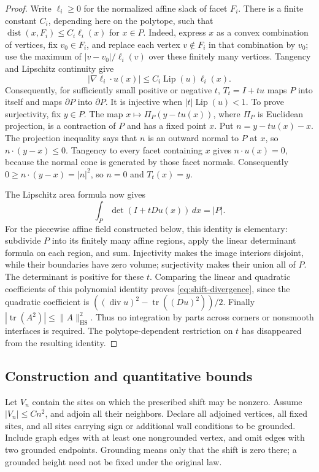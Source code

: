 \begin{proof}
Write $\ell_i\geq0$ for the normalized affine slack of facet $F_i$.
There is a finite constant $C_i$, depending here on the polytope, such that
$\operatorname{dist}(x,F_i)\leq C_i\ell_i(x)$ for $x\in P$. Indeed, express
$x$ as a convex combination of vertices, fix $v_0\in F_i$, and replace
each vertex $v\notin F_i$ in that combination by $v_0$; use the maximum of
$|v-v_0|/\ell_i(v)$ over these finitely many vertices.
Tangency and Lipschitz continuity give
\[
 |\nabla\ell_i\cdot u(x)|
 \leq C_i\operatorname{Lip}(u)\ell_i(x).
\]
Consequently, for sufficiently small positive or negative $t$,
$T_t=I+tu$ maps $P$ into itself and maps $\partial P$ into $\partial P$.
It is injective when $|t|\operatorname{Lip}(u)<1$. To prove surjectivity,
fix $y\in P$. The map $x\mapsto\Pi_P(y-tu(x))$, where $\Pi_P$ is
Euclidean projection, is a contraction of $P$ and has a fixed point $x$.
Put $n=y-tu(x)-x$. The projection inequality says that $n$ is an
outward normal to $P$ at $x$, so $n\cdot(y-x)\le0$. Tangency to every
facet containing $x$ gives $n\cdot u(x)=0$, because the normal cone
is generated by those facet normals. Consequently
$0\ge n\cdot(y-x)=|n|^2$, so $n=0$ and $T_t(x)=y$.

The Lipschitz area formula now gives
\[
 \int_P \det(I+tDu(x))\,dx=|P|.
\]
For the piecewise affine field constructed below, this identity is
elementary: subdivide $P$ into its finitely many affine regions,
apply the linear determinant formula on each region, and sum.
Injectivity makes the image interiors disjoint, while their boundaries
have zero volume; surjectivity makes their union all of $P$.
The determinant is positive for these $t$. Comparing the linear and
quadratic coefficients of this polynomial identity proves
\eqref{eq:shift-divergence}, since the quadratic coefficient is
$((\operatorname{div}u)^2-\operatorname{tr}((Du)^2))/2$.
Finally $|\operatorname{tr}(A^2)|\leq\|A\|_{\mathrm{HS}}^2$.
Thus no integration by parts across corners or nonsmooth interfaces is
required. The polytope-dependent restriction on $t$ has disappeared from
the resulting identity.
\end{proof}

\subsection{Construction and quantitative bounds}

Let $V_n$ contain the sites on which the prescribed shift may be nonzero.
Assume $|V_n|\leq Cn^2$, and adjoin all their neighbors. Declare all adjoined
vertices, all fixed sites, and all sites carrying sign or additional wall
conditions to be grounded. Include graph edges with at least one
nongrounded vertex, and omit edges with two grounded endpoints.
Grounding means only that the shift is zero there; a grounded height need
not be fixed under the original law.

